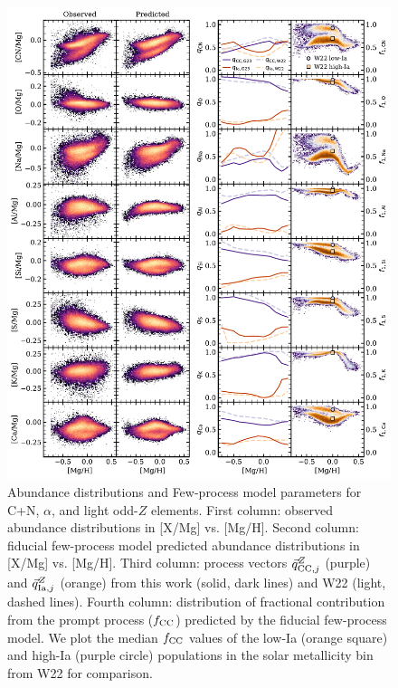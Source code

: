 \documentclass[modern]{aastex631}
\newcommand{\qcc}{\vec{q}_{{\rm CC,}j}^{Z}}
\newcommand{\qIa}{\vec{q}_{{\rm Ia,}j}^{Z}}
\newcommand{\fcc}{f_{\rm CC}}
\begin{document}
\begin{figure}[htb!]
    \centering
    \includegraphics[width=\textwidth]{Paper/Figures/all_param1.pdf}
    \caption{Abundance distributions and Few-process model parameters for C+N, $\alpha$, and light odd-$Z$ elements. First column: observed abundance distributions in [X/Mg] vs. [Mg/H]. Second column: fiducial few-process model predicted abundance distributions in [X/Mg] vs. [Mg/H]. Third column: process vectors $\qcc$ (purple) and $\qIa$ (orange) from this work (solid, dark lines) and W22 (light, dashed lines). Fourth column: distribution of fractional contribution from the prompt process ($\fcc$) predicted by the fiducial few-process model. We plot the median $\fcc$ values of the low-Ia (orange square) and high-Ia (purple circle) populations in the solar metallicity bin from W22 for comparison.}
    \label{fig:all_param1}
\end{figure}
\end{document}
